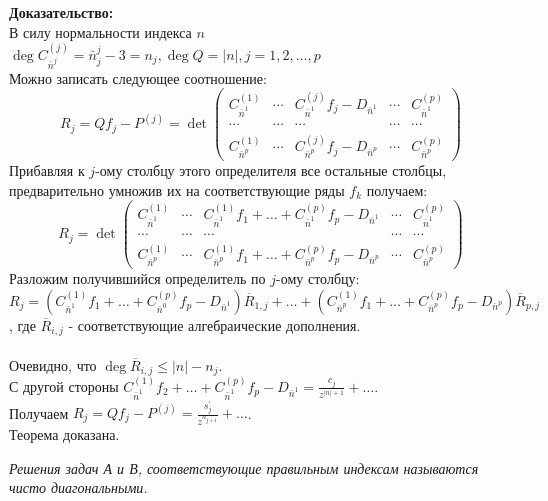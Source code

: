 \textbf{Доказательство:} \\
В силу нормальности индекса $n$ $\deg  C^{(j)}_{\bar{n}^{j}} =
\bar{n}_j^{j}-3 = n_j, \deg  Q = |n|, j=1,2,\ldots,p$\\
Можно записать следующее соотношение:
$$%
R_j=Qf_j-P^{(j)} = \det \left(
\begin{array}{cccccccccccccc}
C^{(1)}_{\bar{n}^{1}} & \cdots &
C^{(j)}_{\bar{n}^{1}}f_j-D_{{\bar{n}^{1}}} & \cdots &
C^{(p)}_{\bar{n}^{1}}
\\
\cdots & \cdots & \cdots & \cdots & \cdots\\
C^{(1)}_{\bar{n}^{p}} & \cdots &
C^{(j)}_{\bar{n}^{p}}f_j-D_{{\bar{n}^{p}}} & \cdots &
C^{(p)}_{\bar{n}^{p}}
\end{array}
\right)
$$%
Прибавляя к $j$-ому столбцу этого определителя все остальные
столбцы, предварительно умножив их на соответствующие ряды $f_k$
получаем:
$$%
R_j=  \det \left(
\begin{array}{cccccccccccccc}
C^{(1)}_{\bar{n}^{1}} & \cdots &
C^{(1)}_{\bar{n}^{1}}f_1+\ldots+C^{(p)}_{\bar{n}^{1}}f_p-D_{{\bar{n}^{1}}}
& \cdots & C^{(p)}_{\bar{n}^{1}}
\\
\cdots & \cdots & \cdots & \cdots & \cdots\\
C^{(1)}_{\bar{n}^{p}} & \cdots &
C^{(1)}_{\bar{n}^{p}}f_1+\ldots+C^{(p)}_{\bar{n}^{p}}f_p-D_{{\bar{n}^{p}}}
& \cdots & C^{(p)}_{\bar{n}^{p}}
\end{array}
\right)
$$%
Разложим получившийся определитель по $j$-ому столбцу:
$$%
R_j=
(C^{(1)}_{\bar{n}^{1}}f_1+\ldots+C^{(p)}_{\bar{n}^{0}}f_p-D_{{\bar{n}^{1}}})
\overline{R}_{1,j}+\ldots+(C^{(1)}_{\bar{n}^{p}}f_1+\ldots+C^{(p)}_{\bar{n}^{p}}f_p-D_{{\bar{n}^{p}}})\overline{R}_{p,j}
$$%
, где $\overline{R}_{i,j}$ - соответствующие
алгебраические
дополнения. \\ \\
Очевидно, что $\deg  \overline{R}_{i,j} \leq |n|-n_j$.\\
С другой стороны
$C^{(1)}_{\bar{n}^{1}}f_2+\ldots+C^{(p)}_{\bar{n}^{1}}f_p-D_{{\bar{n}^{1}}}
= \displaystyle\frac {c_j}{z^{|n|+1}}+\ldots$. \\
Получаем $R_j=Qf_j-P^{(j)} = \displaystyle\frac {s_j^{'}}
{z^{n_{j+1}}} +\ldots$. \\
Теорема доказана. \\
\begin{defi}
\textit{Решения задач А и В, соответствующие правильным индексам
называются чисто диагональными. } \\
\end{defi}
